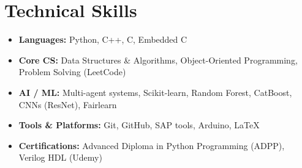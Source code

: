 \documentclass[a4paper,10pt]{article}
\begin{document}
\section{Technical Skills}
\begin{itemize}
\item \textbf{Languages:} Python, C++, C, Embedded C
\item \textbf{Core CS:} Data Structures \& Algorithms, Object-Oriented Programming, Problem Solving (LeetCode)
\item \textbf{AI / ML:} Multi-agent systems, Scikit-learn, Random Forest, CatBoost, CNNs (ResNet), Fairlearn
\item \textbf{Tools \& Platforms:} Git, GitHub, SAP tools, Arduino, \LaTeX
\item \textbf{Certifications:} Advanced Diploma in Python Programming (ADPP), Verilog HDL (Udemy)
\end{itemize}

\end{document}
